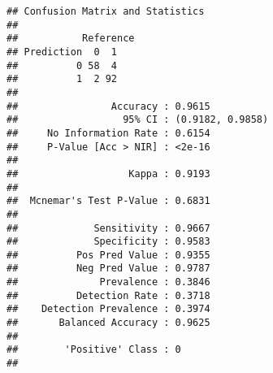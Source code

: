 \documentclass[
]{article}
\begin{document}
\begin{verbatim}
## Confusion Matrix and Statistics
## 
##           Reference
## Prediction  0  1
##          0 58  4
##          1  2 92
##                                           
##                Accuracy : 0.9615          
##                  95% CI : (0.9182, 0.9858)
##     No Information Rate : 0.6154          
##     P-Value [Acc > NIR] : <2e-16          
##                                           
##                   Kappa : 0.9193          
##                                           
##  Mcnemar's Test P-Value : 0.6831          
##                                           
##             Sensitivity : 0.9667          
##             Specificity : 0.9583          
##          Pos Pred Value : 0.9355          
##          Neg Pred Value : 0.9787          
##              Prevalence : 0.3846          
##          Detection Rate : 0.3718          
##    Detection Prevalence : 0.3974          
##       Balanced Accuracy : 0.9625          
##                                           
##        'Positive' Class : 0               
## 
\end{verbatim}
\end{document}
